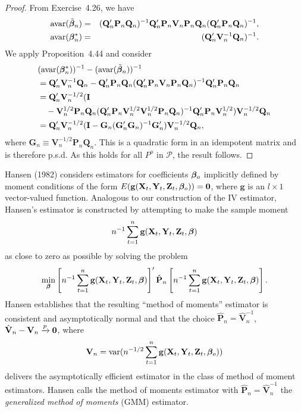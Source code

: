 \begin{proof}
From Exercise~4.26, we have
\begin{eqnarray*}
\mathrm{avar}(\tilde{\boldsymbol{\beta}}_n) &=& (\mathbf{Q}_n'\mathbf{P}_n\mathbf{Q}_n)^{-1}\mathbf{Q}_n'\mathbf{P}_n\mathbf{V}_n\mathbf{P}_n\mathbf{Q}_n(\mathbf{Q}_n'\mathbf{P}_n\mathbf{Q}_n)^{-1},\\
\mathrm{avar}(\boldsymbol{\beta}_n^*) &=& (\mathbf{Q}_n'\mathbf{V}_n^{-1}\mathbf{Q}_n)^{-1}.
\end{eqnarray*}
We apply Proposition~4.44 and consider
\begin{align*}
&(\mathrm{avar}(\boldsymbol{\beta}_n^*))^{-1} - (\mathrm{avar}(\tilde{\boldsymbol{\beta}}_n))^{-1} \\
&= \mathbf{Q}_n'\mathbf{V}_n^{-1}\mathbf{Q}_n - \mathbf{Q}_n'\mathbf{P}_n\mathbf{Q}_n(\mathbf{Q}_n'\mathbf{P}_n\mathbf{V}_n\mathbf{P}_n\mathbf{Q}_n)^{-1}\mathbf{Q}_n'\mathbf{P}_n\mathbf{Q}_n \\
&= \mathbf{Q}_n'\mathbf{V}_n^{-1/2}(\mathbf{I} \\
&\quad -\mathbf{V}_n^{1/2}\mathbf{P}_n\mathbf{Q}_n(\mathbf{Q}_n'\mathbf{P}_n\mathbf{V}_n^{1/2}\mathbf{V}_n^{1/2}\mathbf{P}_n\mathbf{Q}_n)^{-1}\mathbf{Q}_n'\mathbf{P}_n\mathbf{V}_n^{1/2})\mathbf{V}_n^{-1/2}\mathbf{Q}_n \\
&= \mathbf{Q}_n'\mathbf{V}_n^{-1/2}(\mathbf{I} - \mathbf{G}_n(\mathbf{G}_n'\mathbf{G}_n)^{-1}\mathbf{G}_n')\mathbf{V}_n^{-1/2}\mathbf{Q}_n,
\end{align*}
where $\mathbf{G}_n \equiv \mathbf{V}_n^{-1/2}\mathbf{P}_n\mathbf{Q}_n$. This is a quadratic form in an idempotent matrix
and is therefore p.s.d. As this holds for all $P^o$ in $\mathcal{P}$, the result follows.
\end{proof}

Hansen (1982) considers estimators for coefficients $\boldsymbol{\beta}_o$ implicitly defined
by moment conditions of the form $E(\mathbf{g}(\mathbf{X}_t, \mathbf{Y}_t, \mathbf{Z}_t, \boldsymbol{\beta}_o)) = \mathbf{0}$, where $\mathbf{g}$ is
an $l \times 1$ vector-valued function. Analogous to our construction of the IV
estimator, Hansen's estimator is constructed by attempting to make the
sample moment
\[
n^{-1}\sum_{t=1}^{n} \mathbf{g}(\mathbf{X}_t, \mathbf{Y}_t, \mathbf{Z}_t, \boldsymbol{\beta})
\]
as close to zero as possible by solving the problem
\[
\min_{\boldsymbol{\beta}} \left[n^{-1}\sum_{t=1}^{n} \mathbf{g}(\mathbf{X}_t, \mathbf{Y}_t, \mathbf{Z}_t, \boldsymbol{\beta})\right]'\hat{\mathbf{P}}_n\left[n^{-1}\sum_{t=1}^{n} \mathbf{g}(\mathbf{X}_t, \mathbf{Y}_t, \mathbf{Z}_t, \boldsymbol{\beta})\right].
\]
Hansen establishes that the resulting ``method of moments'' estimator is
consistent and asymptotically normal and that the choice $\hat{\mathbf{P}}_n = \hat{\mathbf{V}}_n^{-1}$,
$\hat{\mathbf{V}}_n - \mathbf{V}_n \xrightarrow{p} \mathbf{0}$, where
\[
\mathbf{V}_n = \mathrm{var}(n^{-1/2}\sum_{t=1}^{n} \mathbf{g}(\mathbf{X}_t, \mathbf{Y}_t, \mathbf{Z}_t, \boldsymbol{\beta}_o))
\]
delivers the asymptotically efficient estimator in the class of method of
moment estimators. Hansen calls the method of moments estimator with
$\hat{\mathbf{P}}_n = \hat{\mathbf{V}}_n^{-1}$ the \emph{generalized method of moments} (GMM) estimator.

